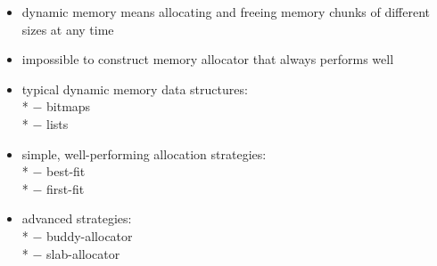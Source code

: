 \begin{summary}
  \begin{itemize}
    \item dynamic memory means allocating and freeing memory chunks of different sizes at any time
    \item impossible to construct memory allocator that always performs well
    \item typical dynamic memory data structures: \\*
      $ - $ bitmaps \\*
      $ - $ lists
    \item simple, well-performing allocation strategies: \\*
      $ - $ best-fit \\*
      $ - $ first-fit
    \item advanced strategies: \\*
      $ - $ buddy-allocator \\*
      $ - $ slab-allocator
  \end{itemize}
\end{summary}